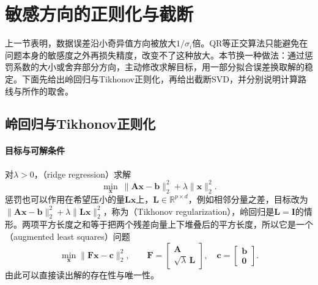 \section{敏感方向的正则化与截断}
\label{sec:ls-truncated-svd-ridge}

上一节表明，数据误差沿小奇异值方向被放大$1/\sigma_i$倍。QR等正交算法只能避免在问题本身的敏感度之外再损失精度，改变不了这种放大。本节换一种做法：通过惩罚系数的大小或舍弃部分方向，主动修改求解目标，用一部分拟合误差换取解的稳定。下面先给出岭回归与Tikhonov正则化，再给出截断SVD，并分别说明计算路线与所作的取舍。

\subsection{岭回归与Tikhonov正则化}
\label{sec:ls-regularized-ls}

\paragraph{目标与可解条件}
对$\lambda>0$，（ridge regression）求解
\begin{equation}
 \min_{\bm x}\ \lVert\bm A\bm x-\bm b\rVert_2^2+\lambda\lVert\bm x\rVert_2^2 .
 \label{eq:ls-ridge-objective}
\end{equation}
惩罚也可以作用在希望压小的量$\bm L\bm x$上，$\bm L\in\mathbb R^{p\times d}$，例如相邻分量之差，目标改为$\lVert\bm A\bm x-\bm b\rVert_2^2+\lambda\lVert\bm L\bm x\rVert_2^2$，称为（Tikhonov regularization），岭回归是$\bm L=\bm I$的情形。两项平方长度之和等于把两个残差向量上下堆叠后的平方长度，所以它是一个（augmented least squares）问题
\begin{equation}
 \min_{\bm x}\lVert\bm F\bm x-\bm c\rVert_2^2,\qquad
 \bm F=\begin{bmatrix}\bm A\\ \sqrt\lambda\,\bm L\end{bmatrix},\quad
 \bm c=\begin{bmatrix}\bm b\\ \bm0\end{bmatrix}.
 \label{eq:ls-augmented-system}
\end{equation}
由此可以直接读出解的存在性与唯一性。

